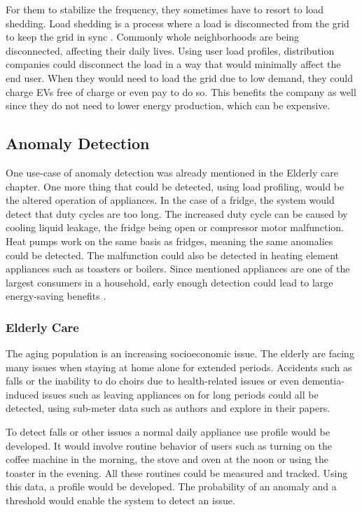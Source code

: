 For them to stabilize the frequency, they sometimes have to resort to load shedding.
Load shedding is a process where a load is disconnected from the grid to keep the grid in sync \cite{loadShedding2006}.
Commonly whole neighborhoods are being disconnected, affecting their daily lives.
Using user load profiles, distribution companies could disconnect the load in a way that would minimally affect the end user. 
When they would need to load the grid due to low demand, they could charge EVs free of charge or even pay to do so. 
This benefits the company as well since they do not need to lower energy production, which can be expensive. 

\subsection{Anomaly Detection}

One use-case of anomaly detection was already mentioned in the Elderly care chapter.
One more thing that could be detected, using load profiling, would be the altered operation of appliances.
In the case of a fridge, the system would detect that duty cycles are too long.
The increased duty cycle can be caused by cooling liquid leakage, the fridge being open or compressor motor malfunction.
Heat pumps work on the same basis as fridges, meaning the same anomalies could be detected. 
The malfunction could also be detected in heating element appliances such as toasters or boilers. 
Since mentioned appliances are one of the largest consumers in a household,
early enough detection could lead to large energy-saving benefits \cite{NILMAD2019}.

\subsubsection{Elderly Care}

The aging population is an increasing socioeconomic issue.
The elderly are facing many issues when staying at home alone for extended periods.
Accidents such as falls or the inability to do choirs due to health-related issues or even dementia-induced issues 
such as leaving appliances on for long periods could all be detected, using sub-meter data such as authors \cite{elder1} and \cite{elder2}
explore in their papers.

To detect falls or other issues a normal daily appliance use profile would be developed.
It would involve routine behavior of users such as turning on the coffee machine in the morning, the stove and oven at the noon or using the toaster in the evening.
All these routines could be measured and tracked. Using this data, a profile would be developed.
The probability of an anomaly and a threshold would enable the system to detect an issue.

